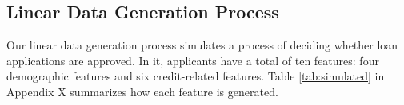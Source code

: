 \documentclass[mnsc,blindrev]{informs3}
\begin{document}
 \subsection{Linear Data Generation Process}
 \label{sec:data_generation}
 Our linear data generation process simulates a process of deciding whether loan applications are approved. In it, applicants have a total of ten features: four demographic features and six credit-related features. Table \ref{tab:simulated} in Appendix X summarizes how each feature is generated. 
\end{document}
